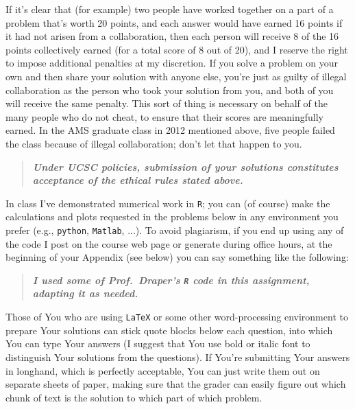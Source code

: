 \documentclass[12pt]{article}
\newcommand{\bi}[1]{\b{\i{#1}}}
\renewcommand{\b}[1]{\textbf{#1}}
\renewcommand{\i}[1]{\textit{#1}}
\renewcommand{\t}[1]{\texttt{#1}}
\begin{document}
If it's clear that (for example) two people have worked together on a part
of a problem that's worth 20 points, and each answer would have earned 16
points if it had not arisen from a collaboration, then each person will
receive 8 of the 16 points collectively earned (for a total score of 8 out
of 20), and I reserve the right to impose additional penalties at my
discretion. If you solve a problem on your own and then share your solution
with anyone else, you're just as guilty of illegal collaboration as
the person who took your solution from you, and both of you will receive
the same penalty. This sort of thing is necessary on behalf of the many
people who do not cheat, to ensure that their scores are meaningfully
earned. In the AMS graduate class in 2012 mentioned above, five people failed the class because of illegal collaboration; don't let that happen to you.

\begin{quote}

\bi{Under UCSC policies, submission of your solutions constitutes acceptance of the ethical rules stated above.}

\end{quote}

In class I've demonstrated numerical work in \texttt{R}; you can (of course) make the calculations and plots requested in the problems below in any environment you prefer (e.g., \t{python}, \texttt{Matlab}, ...). To avoid plagiarism, if you end up using any of the code I post on the course web page or generate during office hours, at the beginning of your Appendix (see below) you can say something like the following:

\begin{quote}

\bi{I used some of Prof.~Draper's \texttt{R} code in this assignment, adapting it as needed.}

\end{quote}

Those of You who are using \texttt{LaTeX} or some other word-processing environment to prepare Your solutions can stick quote blocks below each question, into which You can type Your answers (I suggest that You use bold or italic font to distinguish Your solutions from the questions). If You're submitting Your answers in longhand, which is perfectly acceptable, You can just write them out on separate sheets of paper, making sure that the grader can easily figure out which chunk of text is the solution to which part of which problem.
\end{document}
